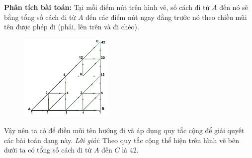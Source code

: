 \begin{multicols}{2}
\begin{multicols}{2}
\begin{figure}[H]
			\vspace*{-15pt}
		\end{figure}
	\end{multicols}
	\textbf{Phân tích bài toán:} Tại mỗi điểm nút trên hình vẽ, số cách đi từ $A$ đến nó sẽ bằng tổng số cách đi từ $A$ đến các điểm nút ngay đằng trước nó theo chiều mũi tên được phép đi (phải, lên trên và đi chéo).
	\begin{multicols}{2}
		\begin{figure}[H]
			\centering
			\vspace*{-5pt}
			\captionsetup{labelformat=empty, justification=centering}
			\includegraphics[width=0.4\textwidth]{_7}
			\vspace*{-15pt}
		\end{figure}
		Vậy nên ta có để điền mũi tên hướng đi và áp dụng quy tắc cộng để giải quyết các bài toán dạng này.
		\vskip 0.1cm
		\textit{Lời giải}: Theo quy tắc cộng thể hiện trên hình vẽ bên dưới ta có tổng số cách đi từ $A$ đến $C$ là $42$.
	\end{multicols}
	

\end{multicols}
